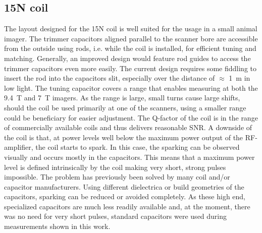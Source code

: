         \subsection{15N coil}
            The layout designed for the 15N coil is well suited for the usage in a small animal imager. The trimmer capacitors aligned parallel to the scanner bore are accessible from the outside using rods, i.e. while the coil is installed, for efficient tuning and matching. Generally, an improved design would feature rod guides to access the trimmer capacitors even more easily. The current design requires some fiddling to insert the rod into the capacitors slit, especially over the distance of $\approx$ \SI{1}{\meter} in low light.
            The tuning capacitor covers a range that enables measuring at both the \SI{9.4}{\tesla} and \SI{7}{\tesla} imagers. As the range is large, small turns cause large shifts, should the coil be used primarily at one of the scanners, using a smaller range could be beneficiary for easier adjustment.
            The Q-factor of the coil is in the range of commercially available coils and thus delivers reasonable SNR.
            A downside of the coil is that, at power levels well below the maximum power output of the RF-amplifier, the coil starts to spark. In this case, the sparking can be observed visually and occurs mostly in the capacitors. This means that a maximum power level is defined intrinsically by the coil making very short, strong pulses impossible. The problem has previously been solved by many coil and/or capacitor manufacturers. Using different dielectrica or build geometries of the capacitors, sparking can be reduced or avoided completely. As these high end, specialized capacitors are much less readily available and, at the moment, there was no need for very short pulses, standard capacitors were used during measurements shown in this work.
